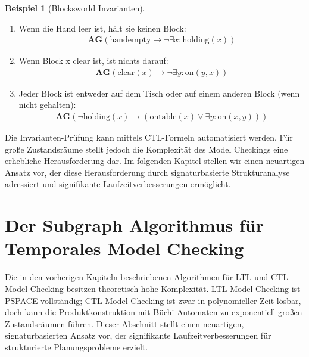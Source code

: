 ﻿\documentclass[a4paper,12pt]{article}
\theoremstyle{definition}
\newtheorem{beispiel}{Beispiel}[section]
\begin{document}
\begin{beispiel}[Blocksworld Invarianten]
	\begin{enumerate}
		\item Wenn die Hand leer ist, hält sie keinen Block:
		\begin{align}
		\mathbf{AG}(\text{handempty} \to \neg\exists x: \text{holding}(x))
		\end{align}
		
		\item Wenn Block x clear ist, ist nichts darauf:
		\begin{align}
		\mathbf{AG}(\text{clear}(x) \to \neg\exists y: \text{on}(y, x))
		\end{align}
		
		\item Jeder Block ist entweder auf dem Tisch oder auf einem anderen Block (wenn nicht gehalten):
		\begin{align}
		\mathbf{AG}(\neg\text{holding}(x) \to (\text{ontable}(x) \lor \exists y: \text{on}(x, y)))
		\end{align}
	\end{enumerate}
\end{beispiel}

Die Invarianten-Prüfung kann mittels CTL-Formeln automatisiert werden. Für große Zustandsräume stellt jedoch die Komplexität des Model Checkings eine erhebliche Herausforderung dar. Im folgenden Kapitel stellen wir einen neuartigen Ansatz vor, der diese Herausforderung durch signaturbasierte Strukturanalyse adressiert und signifikante Laufzeitverbesserungen ermöglicht.


\section{Der Subgraph Algorithmus für Temporales Model Checking}

Die in den vorherigen Kapiteln beschriebenen Algorithmen für LTL und CTL Model Checking besitzen theoretisch hohe Komplexität. LTL Model Checking ist PSPACE-vollständig; CTL Model Checking ist zwar in polynomieller Zeit lösbar, doch kann die Produktkonstruktion mit Büchi-Automaten zu exponentiell großen Zustandsräumen führen. Dieser Abschnitt stellt einen neuartigen, signaturbasierten Ansatz vor, der signifikante Laufzeitverbesserungen für strukturierte Planungsprobleme erzielt.
\end{document}
